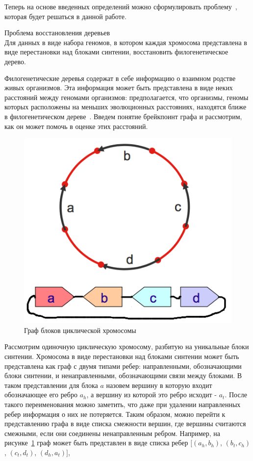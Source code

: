 Теперь на основе введенных определений можно сформулировать проблему~\cite{gusfield1991efficient}, которая будет решаться в данной работе.
\begin{prob}{Проблема восстановления деревьев} \\
  Для данных в виде набора геномов, в котором каждая хромосома представлена в виде перестановки над блоками синтении,
  восстановить филогенетическое дерево.
\end{prob}

Филогенетические деревья содержат в себе информацию о взаимном родстве живых организмов.
Эта информация может быть представлена в виде неких расстояний между геномами организмов: предполагается, что организмы, геномы которых расположены
на меньших эволюционных расстояниях, находятся ближе в филогенетическом дереве~\cite{ohno1973ancient}.
Введем понятие брейкпоинт графа  и рассмотрим, как он может помочь в оценке этих расстояний.
\begin{figure}[H]
  \centering
  \includegraphics[max width=0.5\linewidth]{fig/1/block_graph.png}
  \caption{Граф блоков циклической хромосомы}
  \label{fig:block_graph}
\end{figure}
Рассмотрим одиночную циклическую хромосому, разбитую на уникальные блоки синтении.
Хромосома в виде перестановки над блоками синтении может быть представлена как граф с двумя типами ребер:
направленными, обозначающими блоки синтении, и ненаправленными, обозначающими связи между блоками.
В таком представлении для блока $a$ назовем вершину в которую входит обозначающее его ребро $a_h$, а вершину из которой это ребро исходит - $a_t$.
После такого переименования можно заметить, что даже при удалении направленных ребер информация о них не потеряется.
Таким образом, можно перейти к представлению графа в виде списка смежности вершин,
где вершины считаются смежными, если они соединены ненаправленным ребром.
Например, на рисунке~\ref{fig:block_graph} граф может быть представлен в виде списка ребер $[(a_h, b_h)$, $(b_t, c_h)$, $(c_t, d_t)$, $(d_h, a_t)]$,
